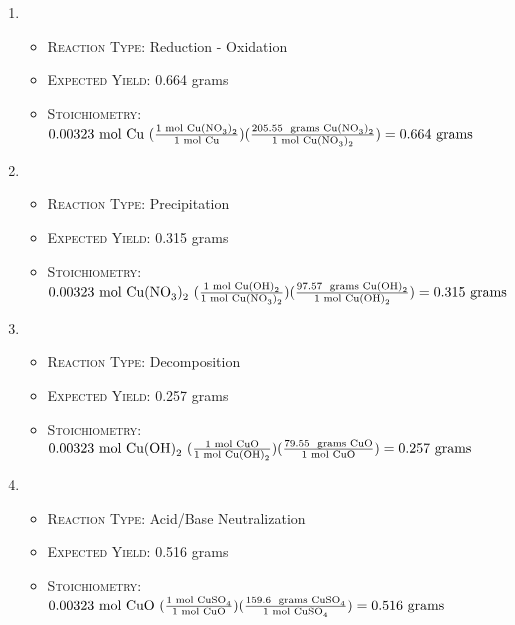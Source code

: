 \documentclass[11pt,letterpaper]{report}
\begin{document}
\begin{enumerate}
\item {}
\begin{itemize}
\item \textsc{Reaction Type:} Reduction - Oxidation
\item \textsc{Expected Yield:} 0.664 grams
\item \textsc{Stoichiometry:} $0.00323 \text{ mol \ce{Cu} } ( \frac{\text{1 mol \ce{Cu(NO3)2}}}{\text{1 mol \ce{Cu}}} ) ( \frac{\text{205.55 \text{ grams} \ce{Cu(NO3)2}}}{\text{1 mol \ce{Cu(NO3)2}}} ) = 0.664 \text{ grams}$
\end{itemize}
\item {}
\begin{itemize}
\item \textsc{Reaction Type:} Precipitation
\item \textsc{Expected Yield:} 0.315 grams
\item \textsc{Stoichiometry:} $0.00323 \text{ mol \ce{Cu(NO3)2} } ( \frac{\text{1 mol \ce{Cu(OH)2}}}{\text{1 mol \ce{Cu(NO3)2}}} ) ( \frac{\text{97.57 \text{ grams} \ce{Cu(OH)2}}}{\text{1 mol \ce{Cu(OH)2}}} ) = 0.315 \text{ grams}$
\end{itemize}
\item {}
\begin{itemize}
\item \textsc{Reaction Type:} Decomposition
\item \textsc{Expected Yield:} 0.257 grams
\item \textsc{Stoichiometry:} $0.00323 \text{ mol \ce{Cu(OH)2} } ( \frac{\text{1 mol \ce{CuO}}}{\text{1 mol \ce{Cu(OH)2}}} ) ( \frac{\text{79.55 \text{ grams} \ce{CuO}}}{\text{1 mol \ce{CuO}}} ) = 0.257 \text{ grams}$
\end{itemize}
\item {}
\begin{itemize}
\item \textsc{Reaction Type:} Acid/Base Neutralization
\item \textsc{Expected Yield:} 0.516 grams
\item \textsc{Stoichiometry:} $0.00323 \text{ mol \ce{CuO} } ( \frac{\text{1 mol \ce{CuSO4}}}{\text{1 mol \ce{CuO}}} ) ( \frac{\text{159.6 \text{ grams} \ce{CuSO4}}}{\text{1 mol \ce{CuSO4}}} ) = 0.516 \text{ grams}$
\end{itemize}

\end{enumerate}
\end{document}
